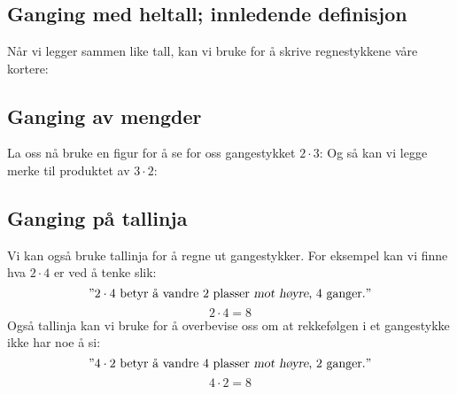 \section{\gong \label{Gonging} }

\subsection*{Ganging med heltall; innledende definisjon}
Når vi legger sammen like tall, kan vi bruke  \sym{$ \cdot $}\;for å skrive regnestykkene våre kortere: \regv
{} \regv
{}

\newpage
\subsection*{Ganging av mengder} \label{gangmengd}
La oss nå bruke en figur for å se for oss gangestykket $ 2\cdot3 $:
Og så kan vi legge merke til produktet av $ 3\cdot 2 $:
\reg[\gangkom \label{gangkom}]{
	Produktet er det samme uansett rekkefølge på faktorene.
}

\subsection*{Ganging på tallinja}
Vi kan også bruke tallinja for å regne ut gangestykker. For eksempel kan vi finne hva $ 2\cdot4 $ er ved å tenke slik:
\[\text{''} 2\cdot 4 \text{ betyr å vandre 2 plasser \textsl{mot høyre}, 4 ganger.}\text{''} \]
\[ 2\cdot4=8 \]
Også tallinja kan vi bruke for å overbevise oss om at rekkefølgen i et gangestykke ikke har noe å si:
\[\text{''} 4\cdot 2 \text{ betyr å vandre 4 plasser \textsl{mot høyre}, 2 ganger.}\text{''} \]
\[ 4\cdot2=8 \]

